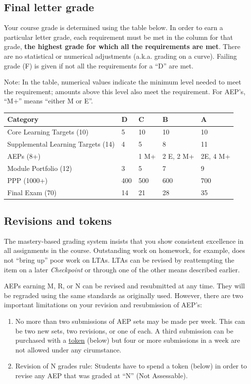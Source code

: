 \hypertarget{final-letter-grade}{%
\subsection{Final letter grade}\label{final-letter-grade}}

Your course grade is determined using the table below. In order to earn
a particular letter grade, each requirement must be met in the column
for that grade, \textbf{the highest grade for which all the requirements
are met}. There are no statistical or numerical adjustments (a.k.a.
grading on a curve). Failing grade (F) is given if not all the
requirements for a ``D'' are met.

Note: In the table, numerical values indicate the minimum level needed
to meet the requirement; amounts above this level also meet the
requirement. For AEP's, ``M+'' means ``either M or E''.

\begin{longtable}[]{@{}lllll@{}}
\toprule
Category & D & C & B & A\tabularnewline
\midrule
\endhead
Core Learning Targets (10) & 5 & 10 & 10 & 10\tabularnewline
Supplemental Learning Targets (14) & 4 & 5 & 8 & 11\tabularnewline
AEPs (8+) & & 1 M+ & 2 E, 2 M+ & 2E, 4 M+\tabularnewline
Module Portfolio (12) & 3 & 5 & 7 & 9\tabularnewline
PPP (1000+) & 400 & 500 & 600 & 700\tabularnewline
Final Exam (70) & 14 & 21 & 28 & 35\tabularnewline
\bottomrule
\end{longtable}

\hypertarget{revisions}{%
\subsection{Revisions and tokens}\label{revisions}}

The mastery-based grading system insists that you show consistent
excellence in all assignments in the course. Outstanding work on
homework, for example, does not ``bring up'' poor work on LTAs. LTAs can
be revised by reattempting the item on a later \emph{Checkpoint} or
through one of the other means described earlier.

AEPs earning M, R, or N can be revised and resubmitted at any time. They
will be regraded using the same standards as originally used. However,
there are two important limitations on your revision and resubmission of
AEP's:

\begin{enumerate}
\def\labelenumi{\arabic{enumi}.}
\tightlist
\item
  No more than two submissions of AEP sets may be made per week. This
  can be two new sets, two revisions, or one of each. A third submission
  can be purchased with a \protect\hyperlink{tokens}{token} (below) but
  four or more submissions in a week are not allowed under any
  cirumstance.
\item
  Revision of N grades rule: Students have to spend a token (below) in
  order to revise any AEP that was graded at ``N'' (Not Assessable).
\end{enumerate}


